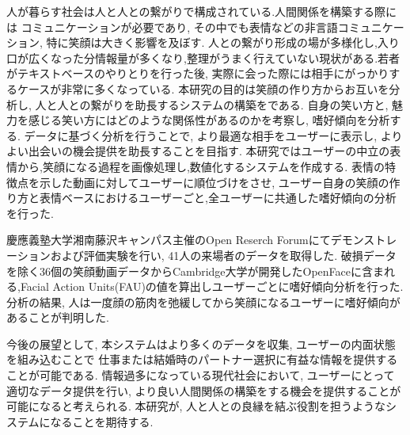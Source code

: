


\begin{jabstract}
人が暮らす社会は人と人との繋がりで構成されている.人間関係を構築する際には
コミュニケーションが必要であり, その中でも表情などの非言語コミュニケーション,
特に笑顔は大きく影響を及ぼす.
人との繋がり形成の場が多様化し,入り口が広くなった分情報量が多くなり,整理がうまく行えていない現状がある.若者がテキストベースのやりとりを行った後, 実際に会った際には相手にがっかりするケースが非常に多くなっている.
本研究の目的は笑顔の作り方からお互いを分析し, 人と人との繋がりを助長するシステムの構築をである.
自身の笑い方と, 魅力を感じる笑い方にはどのような関係性があるのかを考察し, 嗜好傾向を分析する.
データに基づく分析を行うことで, より最適な相手をユーザーに表示し, よりよい出会いの機会提供を助長することを目指す.
本研究ではユーザーの中立の表情から,笑顔になる過程を画像処理し,数値化するシステムを作成する.
表情の特徴点を示した動画に対してユーザーに順位づけをさせ, ユーザー自身の笑顔の作り方と表情ベースにおけるユーザーごと,全ユーザーに共通した嗜好傾向の分析を行った.

慶應義塾大学湘南藤沢キャンパス主催のOpen Reserch Forumにてデモンストレーションおよび評価実験を行い, 41人の来場者のデータを取得した. 破損データを除く36個の笑顔動画データからCambridge大学が開発したOpenFaceに含まれる,Facial Action Units(FAU)の値を算出しユーザーごとに嗜好傾向分析を行った.
分析の結果, 人は一度顔の筋肉を弛緩してから笑顔になるユーザーに嗜好傾向があることが判明した.

今後の展望として, 本システムはより多くのデータを収集, ユーザーの内面状態を組み込むことで
仕事または結婚時のパートナー選択に有益な情報を提供することが可能である.
情報過多になっている現代社会において, ユーザーにとって適切なデータ提供を行い,
より良い人間関係の構築をする機会を提供することが可能になると考えられる.
本研究が, 人と人との良縁を結ぶ役割を担うようなシステムになることを期待する.

\end{jabstract}

